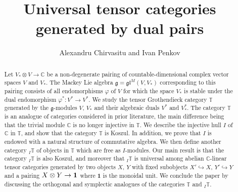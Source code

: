 \documentclass[11pt]{article}
\title{Universal tensor categories generated by dual pairs}
\author{Alexandru Chirvasitu and Ivan Penkov}
\theoremstyle{plain}
\theoremstyle{nonumberplain}
\theoremstyle{plain}
\numberwithin{equation}{section}
\theoremstyle{nonumberplain}
\newcommand\bT{{\mathbb T}}
\newcommand\1{{\bf 1}}
\begin{document}
\date{}


\newcommand{\Addresses}{{%
  \bigskip
  \footnotesize

  \textsc{Department of Mathematics, University at Buffalo, Buffalo,
    NY 14260-2900, USA}\par\nopagebreak
  \textit{E-mail address}: \texttt{achirvas@buffalo.edu}

  \medskip

  \textsc{Jacobs University Bremen, Campus Ring 1, 28759 Bremen, Germany}\par\nopagebreak
  \textit{E-mail address}: \texttt{i.penkov@jacobs-university.de}  

}}


\maketitle

\begin{abstract}
  Let $V_*\otimes V\rightarrow\mathbb{C}$ be a non-degenerate pairing of countable-dimensional complex vector spaces $V$ and $V_*$. The Mackey Lie algebra $\mathfrak{g}=\mathfrak{gl}^M(V,V_*)$ corresponding to this pairing consists of all endomorphisms $\varphi$ of $V$ for which the space $V_*$ is stable under the dual endomorphism $\varphi^*: V^*\rightarrow V^*$. We study the tensor Grothendieck category $\mathbb{T}$ generated by the $\mathfrak{g}$-modules $V$, $V_*$ and their algebraic duals $V^*$ and $V^*_*$. The category $\bT$ is an analogue of categories considered in prior literature, the main difference being that the trivial module $\mathbb{C}$ is no longer injective in $\mathbb{T}$. We describe the injective hull $I$ of $\mathbb{C}$ in $\mathbb{T}$, and show that the category $\mathbb{T}$ is Koszul. In addition, we prove that $I$ is endowed with a natural structure of commutative algebra. We then define another category $_I\mathbb{T}$ of objects in $\mathbb{T}$ which are free as $I$-modules. Our main result is that the category ${}_I\mathbb{T}$ is also Koszul, and moreover that ${}_I\mathbb{T}$ is universal among abelian $\mathbb{C}$-linear tensor categories generated by two objects $X$, $Y$ with fixed subobjects $X'\hookrightarrow X$, $Y'\hookrightarrow Y$ and a pairing $X\otimes Y\rightarrow \text{\textbf{1}}$ where \textbf{1} is the monoidal unit. We conclude the paper by discussing the orthogonal and symplectic analogues of the categories $\mathbb{T}$ and ${}_I\mathbb{T}$.
\end{abstract}
\end{document}
